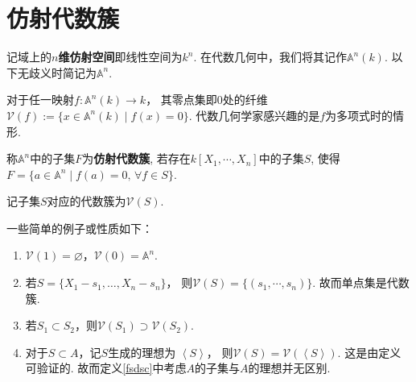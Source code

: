 \section{仿射代数簇}
    记域上的\textbf{$n$维仿射空间}即线性空间为$k^{n}$.
    在代数几何中，我们将其记作$\mathbb{A}^{n}(k)$. 
    以下无歧义时简记为$\mathbb{A}^{n}$.

    对于任一映射$f \colon \mathbb{A}^{n}(k) \to k$，
    其零点集即$0$处的纤维
    $\mathcal{V}(f) := \{x \in \mathbb{A}^{n}(k) \mid f(x) = 0\}$.
    代数几何学家感兴趣的是$f$为多项式时的情形.
      
    \begin{definition}\label{fsdsc}
        称$\mathbb{A}^{n}$中的子集$F$为\textbf{仿射代数簇}, 
        若存在$k[X_{1},\cdots,X_{n}]$中的子集$S$, 
        使得
        $F=\{a \in \mathbb{A}^{n} \mid f(a)=0,\,\forall f \in S\}$.

        记子集$S$对应的代数簇为$\mathcal{V}(S)$.
    \end{definition}

    一些简单的例子或性质如下：

    \begin{example}
        \begin{enumerate}
            \item[(1)] $\mathcal{V}(1) = \varnothing$，$\mathcal{V}(0)=\mathbb{A}^{n}$.
            
            \item[(2)] 若$S=\{X_{1}-s_{1},\ldots,X_{n}-s_{n}\}$，
                  则$\mathcal{V}(S)=\{(s_{1},\cdots,s_{n})\}$. 故而单点集是代数簇.
            
            \item[(3)] 若$S_{1} \subset S_{2}$，则$\mathcal{V}(S_{1}) \supset \mathcal{V}(S_{2})$.
            
            \item[(4)] 对于$S \subset A$，记$S$生成的理想为
                  $\left< S \right>$，
                  则$\mathcal{V}(S)=\mathcal{V}(\left< S \right>)$. 
                  这是由定义可验证的. 
                  故而定义\ref{fsdsc}中考虑$A$的子集与$A$的理想并无区别.
         \end{enumerate}
    \end{example}         
  
